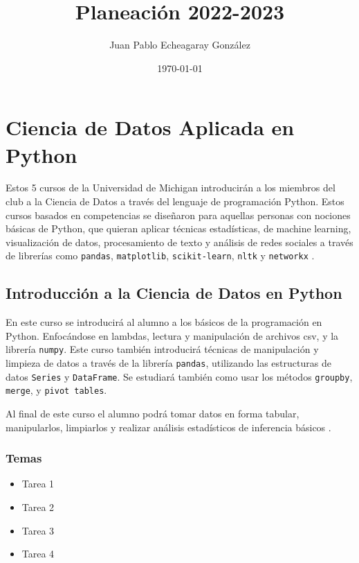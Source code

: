 \documentclass{article}
\title{Planeación 2022-2023}
\author{Juan Pablo Echeagaray González}
\date{\today}
\begin{document}
    \begin{titlepage}
        \maketitle
    \end{titlepage}

    \tableofcontents
    \clearpage

    \section{Ciencia de Datos Aplicada en Python}

        Estos 5 cursos de la Universidad de Michigan introducirán a los miembros del club a la Ciencia de Datos a través del lenguaje de programación Python. Estos cursos basados en competencias se diseñaron para aquellas personas con nociones básicas de Python, que quieran aplicar técnicas estadísticas, de machine learning, visualización de datos, procesamiento de texto y análisis de redes sociales a través de librerías como \texttt{pandas}, \texttt{matplotlib}, \texttt{scikit-learn}, \texttt{nltk} y \texttt{networkx} \cite{applied-ds}.

        \subsection{Introducción a la Ciencia de Datos en Python}

            En este curso se introducirá al alumno a los básicos de la programación en Python. Enfocándose en lambdas, lectura y manipulación de archivos csv, y la librería \texttt{numpy}. Este curso también introducirá técnicas de manipulación y limpieza de datos a través de la librería \texttt{pandas}, utilizando las estructuras de datos \texttt{Series} y \texttt{DataFrame}. Se estudiará también como usar los métodos \texttt{groupby}, \texttt{merge}, y \texttt{pivot tables}.

            Al final de este curso el alumno podrá tomar datos en forma tabular, manipularlos, limpiarlos y realizar análisis estadísticos de inferencia básicos \cite{intro-ds}.

            \subsubsection{Temas}

                \begin{itemize}
                    \item Tarea 1
                    \item Tarea 2
                    \item Tarea 3
                    \item Tarea 4
                \end{itemize}
\end{document}
